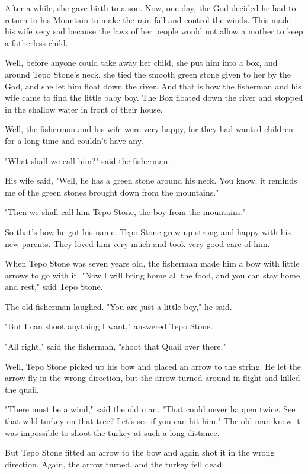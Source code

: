 After a while, she gave birth to a son. Now, one day, the God decided he had to return to his Mountain to make the rain fall and control the winds. This made his wife very sad because the laws of her people would not allow a mother to keep a fatherless child.

Well, before anyone could take away her child, she put him into a box, and around Tepo Stone's neck, she tied the smooth green stone given to her by the God, and she let him float down the river. And that is how the fisherman and his wife came to find the little baby boy. The Box floated down the river and stopped in the shallow water in front of their house.

Well, the fisherman and his wife were very happy, for they had wanted children for a long time and couldn't have any.

"What shall we call him?" said the fisherman.

His wife said, "Well, he has a green stone around his neck. You know, it reminds me of the green stones brought down from the mountains."

"Then we shall call him Tepo Stone, the boy from the mountains."

So that's how he got his name. Tepo Stone grew up strong and happy with his new parents. They loved him very much and took very good care of him.

When Tepo Stone was seven years old, the fisherman made him a bow with little arrows to go with it. "Now I will bring home all the food, and you can stay home and rest," said Tepo Stone.

The old fisherman laughed. "You are just a little boy," he said.

"But I can shoot anything I want," answered Tepo Stone.

"All right," said the fisherman, "shoot that Quail over there."

Well, Tepo Stone picked up his bow and placed an arrow to the string. He let the arrow fly in the wrong direction, but the arrow turned around in flight and killed the quail.

"There must be a wind," said the old man. "That could never happen twice. See that wild turkey on that tree? Let's see if you can hit him." The old man knew it was impossible to shoot the turkey at such a long distance.

But Tepo Stone fitted an arrow to the bow and again shot it in the wrong direction. Again, the arrow turned, and the turkey fell dead.

